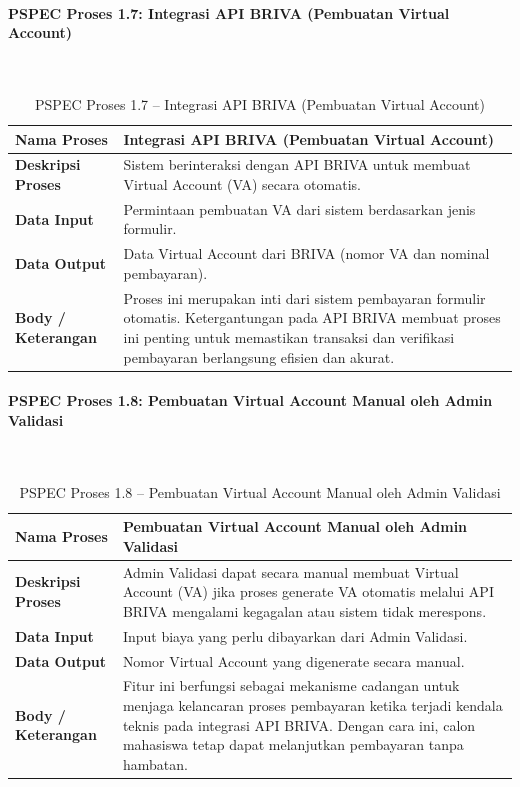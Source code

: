 
\paragraph{PSPEC Proses 1.7: Integrasi API BRIVA (Pembuatan Virtual Account)}~\\
\begin{longtable}{|p{}|p{}|}
	\caption{PSPEC Proses 1.7 -- Integrasi API BRIVA (Pembuatan Virtual Account)}
	\label{table:3.pspec17}\\
	\hline
	\textbf{Nama Proses} & Integrasi API BRIVA (Pembuatan Virtual Account) \\
	\hline
	\textbf{Deskripsi Proses} & Sistem berinteraksi dengan API BRIVA untuk membuat Virtual Account (VA) secara otomatis. \\
	\hline
	\textbf{Data Input} & Permintaan pembuatan VA dari sistem berdasarkan jenis formulir. \\
	\hline
	\textbf{Data Output} & Data Virtual Account dari BRIVA (nomor VA dan nominal pembayaran). \\
	\hline
	\textbf{Body / Keterangan} & Proses ini merupakan inti dari sistem pembayaran formulir otomatis. Ketergantungan pada API BRIVA membuat proses ini penting untuk memastikan transaksi dan verifikasi pembayaran berlangsung efisien dan akurat. \\
	\hline
\end{longtable}

\paragraph{PSPEC Proses 1.8: Pembuatan Virtual Account Manual oleh Admin Validasi}~\\
\begin{longtable}{|p{}|p{}|}
	\caption{PSPEC Proses 1.8 -- Pembuatan Virtual Account Manual oleh Admin Validasi}
	\label{table:3.pspec18}\\
	\hline
	\textbf{Nama Proses} & Pembuatan Virtual Account Manual oleh Admin Validasi \\
	\hline
	\textbf{Deskripsi Proses} & Admin Validasi dapat secara manual membuat Virtual Account (VA) jika proses generate VA otomatis melalui API BRIVA mengalami kegagalan atau sistem tidak merespons. \\
	\hline
	\textbf{Data Input} & Input biaya yang perlu dibayarkan dari Admin Validasi. \\
	\hline
	\textbf{Data Output} & Nomor Virtual Account yang digenerate secara manual. \\
	\hline
	\textbf{Body / Keterangan} & Fitur ini berfungsi sebagai mekanisme cadangan untuk menjaga kelancaran proses pembayaran ketika terjadi kendala teknis pada integrasi API BRIVA. Dengan cara ini, calon mahasiswa tetap dapat melanjutkan pembayaran tanpa hambatan. \\
	\hline
\end{longtable}

